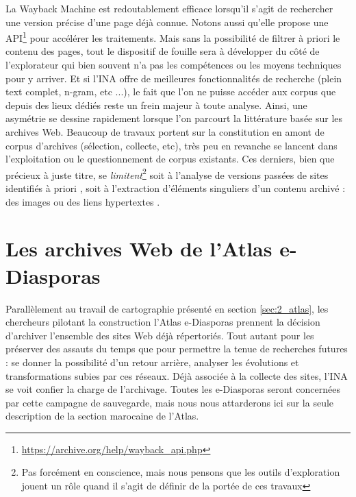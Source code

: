 \documentclass[symmetric,justified,marginals=raggedouter]{tufte-book}
\begin{document}
La Wayback Machine est redoutablement efficace lorsqu'il s'agit de rechercher une version précise d'une page déjà connue. Notons aussi qu'elle propose une API\footnote{\url{https://archive.org/help/wayback_api.php}} pour accélérer les traitements. Mais sans la possibilité de filtrer à priori le contenu des pages, tout le dispositif de fouille sera à développer du côté de l'explorateur qui bien souvent n'a pas les compétences ou les moyens techniques pour y arriver. Et si l'INA offre de meilleures fonctionnalités de recherche (plein text complet, n-gram, etc ...), le fait que l'on ne puisse accéder aux corpus que depuis des lieux dédiés reste un frein majeur à toute analyse. Ainsi, une asymétrie se dessine rapidement lorsque l'on parcourt la littérature basée sur les archives Web. Beaucoup de travaux portent sur la constitution en amont de corpus d'archives (sélection, collecte, etc), très peu en revanche se lancent dans l'exploitation ou le questionnement de corpus existants. Ces derniers, bien que précieux à juste titre, se \textit{limitent}\footnote{Pas forcément en conscience, mais nous pensons que les outils d'exploration jouent un rôle quand il s'agit de définir de la portée de ces travaux} soit à l'analyse de versions passées de sites identifiés à priori \citep{schafer_web_2016,gebeil_les_2016}, soit à l'extraction d'éléments singuliers d'un contenu archivé : des images \citep{ben-david_internet_2018} ou des liens hypertextes \citep{weltevrede_where_2012}. 

\section{Les archives Web de l'Atlas e-Diasporas}
\label{sec:3_edias}

\noindent Parallèlement au travail de cartographie présenté en section \ref{sec:2_atlas}, les chercheurs pilotant la construction l'Atlas e-Diasporas prennent la décision d'archiver l'ensemble des sites Web déjà répertoriés. Tout autant pour les préserver des assauts du temps \citep{khouzaimi_e-diasporas_2015} que pour permettre la tenue de recherches futures : se donner la possibilité d'un retour arrière, analyser les évolutions et transformations subies par ces réseaux. Déjà associée à la collecte des sites, l'INA se voit confier la charge de l'archivage. Toutes les e-Diasporas seront concernées par cette campagne de sauvegarde, mais  nous nous attarderons ici sur la seule description de la section marocaine de l'Atlas. 
\end{document}
